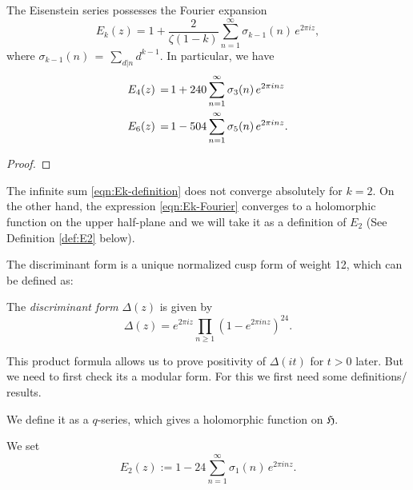 \begin{lemma}\label{lemma:Ek-Fourier}\leanok
The Eisenstein series possesses the Fourier expansion
\begin{equation}\label{eqn:Ek-Fourier}E_k(z)=1+\frac{2}{\zeta(1-k)}\sum_{n=1}^\infty \sigma_{k-1}(n)\,e^{2\pi i z}, \end{equation}
where $\sigma_{k-1}(n)\,=\,\sum_{d|n} d^{k-1}$. In particular, we have
\begin{align}
  E_4(z)\,=\,& 1+240\sum_{n=1}^\infty \sigma_3(n)\,e^{2\pi i n z} \notag \\
  E_6(z)\,=\,& 1-504\sum_{n=1}^\infty \sigma_5(n)\,e^{2\pi i n z}. \notag
\end{align}
\end{lemma}

\begin{proof}
\leanok
\end{proof}

The infinite sum \eqref{eqn:Ek-definition} does not converge absolutely for $k=2$.
On the other hand, the expression \eqref{eqn:Ek-Fourier} converges to a holomorphic function on the upper half-plane and we will take it as a definition of $E_2$ (See Definition \ref{def:E2} below).


The discriminant form is a unique normalized cusp form of weight 12, which can be defined as:
\begin{definition}\label{def:disc-definition}\leanok{}
The \emph{discriminant form} $\Delta(z)$ is given by
\begin{equation}\label{eqn:disc-definition}
\Delta(z) = e^{2 \pi i z} \prod_{n \ge 1} (1 - e^{2 \pi i n z})^{24}.
\end{equation}
\end{definition}

This product formula allows us to prove positivity of $\Delta(it)$ for $t > 0$ later. But we need to first check its a modular form. For this we first need some definitions/ results.

We define it as a $q$-series, which gives a holomorphic function on $\mathfrak{H}$.
\begin{definition}\label{def:E2}\leanok
We set
\begin{equation}\label{eqn:E2}
    E_2(z):= 1-24\sum_{n=1}^\infty \sigma_1(n)\,e^{2\pi i n z}.
\end{equation}
\end{definition}

